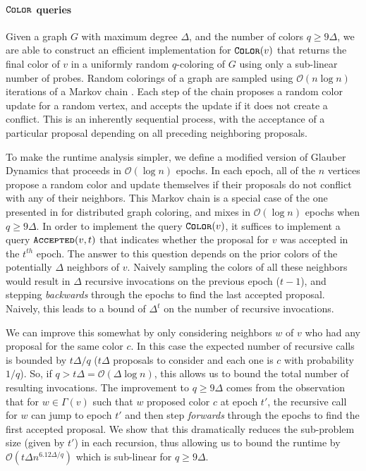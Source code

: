 \paragraph*{$\texttt{\textsc{Color}}$ queries}
\label{par:color_queries}
Given a graph $G$ with maximum degree $\Delta$, and the number of colors $q\ge 9\Delta$,
we are able to construct an efficient implementation for $\texttt{\textsc{Color}}(v)$ that returns the final color of $v$
in a uniformly random $q$-coloring of $G$ using only a sub-linear number of probes.
Random colorings of a graph are sampled using $\mathcal O(n\log n)$ iterations of a Markov chain \cite{glauber_survey}.
Each step of the chain proposes a random color update for a random vertex, and accepts the update if it does not create a conflict.
This is an inherently sequential process, with the acceptance of a particular proposal depending on all preceding neighboring proposals.

To make the runtime analysis simpler, we define a modified version of Glauber Dynamics that proceeds in $\mathcal O(\log n)$ epochs.
In each epoch, all of the $n$ vertices propose a random color and update themselves if their proposals do not conflict with any of their neighbors.
This Markov chain is a special case of the one presented in \cite{ghaffari_fischer} for distributed graph coloring,
and mixes in $\mathcal O(\log n)$ epochs when $q\ge 9\Delta$.
In order to implement the query $\texttt{\textsc{Color}}(v)$, it suffices to implement a query $\texttt{\textsc{Accepted}}(v,t)$
that indicates whether the proposal for $v$ was accepted in the $t^{th}$ epoch.
The answer to this question depends on the prior colors of the potentially $\Delta$ neighbors of $v$.
Naively sampling the colors of all these neighbors would result in $\Delta$ recursive invocations on the previous epoch ($t-1$),
and stepping \emph{backwards} through the epochs to find the last accepted proposal.
Naively, this leads to a bound of $\Delta^t$ on the number of recursive invocations.

We can improve this somewhat by only considering neighbors $w$ of $v$ who had any proposal for the same color $c$.
In this case the expected number of recursive calls is bounded by $t\Delta/q$
($t\Delta$ proposals to consider and each one is $c$ with probability $1/q$).
So, if $q > t\Delta = \mathcal O(\Delta\log n)$, this allows us to bound the total number of resulting invocations.
The improvement to $q\ge 9\Delta$ comes from the observation that for $w\in\Gamma(v)$ such that $w$ proposed color $c$ at epoch $t'$,
the recursive call for $w$ can jump to epoch $t'$ and then step \emph{forwards} through the epochs to find the first accepted proposal.
We show that this dramatically reduces the sub-problem size (given by $t'$) in each recursion,
thus allowing us to bound the runtime by $\mathcal O\left(t\Delta n^{6.12\Delta/q}\right)$ which is sub-linear for $q \ge 9\Delta$.
